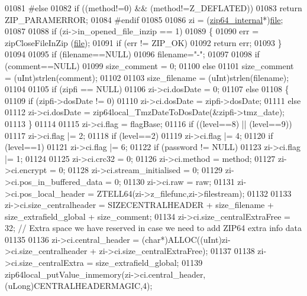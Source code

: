 \begin{DoxyCode}
01081 \textcolor{preprocessor}{#else}
01082     \textcolor{keywordflow}{if} ((method!=0) && (method!=Z\_DEFLATED))
01083       \textcolor{keywordflow}{return} ZIP\_PARAMERROR;
01084 \textcolor{preprocessor}{#endif}
01085 
01086     zi = (\hyperlink{structzip64__internal}{zip64\_internal}*)\hyperlink{structfile}{file};
01087 
01088     \textcolor{keywordflow}{if} (zi->in\_opened\_file\_inzip == 1)
01089     \{
01090         err = zipCloseFileInZip (\hyperlink{structfile}{file});
01091         \textcolor{keywordflow}{if} (err != ZIP\_OK)
01092             \textcolor{keywordflow}{return} err;
01093     \}
01094 
01095     \textcolor{keywordflow}{if} (filename==NULL)
01096         filename=\textcolor{stringliteral}{"-"};
01097 
01098     \textcolor{keywordflow}{if} (comment==NULL)
01099         size\_comment = 0;
01100     \textcolor{keywordflow}{else}
01101         size\_comment = (uInt)strlen(comment);
01102 
01103     size\_filename = (uInt)strlen(filename);
01104 
01105     \textcolor{keywordflow}{if} (zipfi == NULL)
01106         zi->ci.dosDate = 0;
01107     \textcolor{keywordflow}{else}
01108     \{
01109         \textcolor{keywordflow}{if} (zipfi->dosDate != 0)
01110             zi->ci.dosDate = zipfi->dosDate;
01111         \textcolor{keywordflow}{else}
01112           zi->ci.dosDate = zip64local\_TmzDateToDosDate(&zipfi->tmz\_date);
01113     \}
01114 
01115     zi->ci.flag = flagBase;
01116     \textcolor{keywordflow}{if} ((level==8) || (level==9))
01117       zi->ci.flag |= 2;
01118     \textcolor{keywordflow}{if} (level==2)
01119       zi->ci.flag |= 4;
01120     \textcolor{keywordflow}{if} (level==1)
01121       zi->ci.flag |= 6;
01122     \textcolor{keywordflow}{if} (password != NULL)
01123       zi->ci.flag |= 1;
01124 
01125     zi->ci.crc32 = 0;
01126     zi->ci.method = method;
01127     zi->ci.encrypt = 0;
01128     zi->ci.stream\_initialised = 0;
01129     zi->ci.pos\_in\_buffered\_data = 0;
01130     zi->ci.raw = raw;
01131     zi->ci.pos\_local\_header = ZTELL64(zi->z\_filefunc,zi->filestream);
01132 
01133     zi->ci.size\_centralheader = SIZECENTRALHEADER + size\_filename + size\_extrafield\_global + size\_comment;
01134     zi->ci.size\_centralExtraFree = 32; \textcolor{comment}{// Extra space we have reserved in case we need to add ZIP64 extra
       info data}
01135 
01136     zi->ci.central\_header = (\textcolor{keywordtype}{char}*)ALLOC((uInt)zi->ci.size\_centralheader + zi->ci.size\_centralExtraFree);
01137 
01138     zi->ci.size\_centralExtra = size\_extrafield\_global;
01139     zip64local\_putValue\_inmemory(zi->ci.central\_header,(uLong)CENTRALHEADERMAGIC,4);

\end{DoxyCode}
